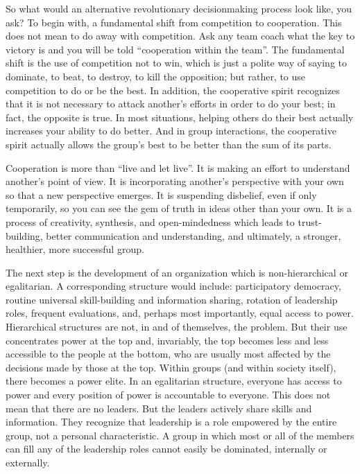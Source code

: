 So what would an alternative revolutionary decisionmaking process
look like, you ask?  To begin with, a fundamental shift from
competition to cooperation.  This does not mean to do away with
competition.  Ask any team coach what the key to victory is and
you will be told ``cooperation within the team''.  The
fundamental shift is the use of competition not to win, which is
just a polite way of saying to dominate, to beat, to destroy, to
kill the opposition; but rather, to use competition to do or be
the best.  In addition, the cooperative spirit recognizes that it
is not necessary to attack another's efforts in order to do your
best; in fact, the opposite is true.  In most situations, helping
others do their best actually increases your ability to do better.
And in group interactions, the cooperative spirit actually allows
the group's best to be better than the sum of its parts.

Cooperation is more than ``live and let live''.  It is
making an effort to understand another's point of view.  It is
incorporating another's perspective with your own so that a new
perspective emerges.  It is suspending disbelief, even if only
temporarily, so you can see the gem of truth in ideas other than
your own.  It is a process of creativity, synthesis, and
open-mindedness which leads to trust-building, better
communication and understanding, and ultimately, a stronger,
healthier, more successful group.

The next step is the development of an organization which is
non-hierarchical or egalitarian.  A corresponding structure would
include: participatory democracy, routine universal skill-building
and information sharing, rotation of leadership roles, frequent
evaluations, and, perhaps most importantly, equal access to power.
Hierarchical structures are not, in and of themselves, the
problem.  But their use concentrates power at the top and,
invariably, the top becomes less and less accessible to the people
at the bottom, who are usually most affected by the decisions made
by those at the top.  Within groups (and within society itself),
there becomes a power elite.  In an egalitarian structure,
everyone has access to power and every position of power is
accountable to everyone.  This does not mean that there are no
leaders.  But the leaders actively share skills and information.
They recognize that leadership is a role empowered by the entire
group, not a personal characteristic.  A group in which most or
all of the members can fill any of the leadership roles cannot
easily be dominated, internally or externally.

